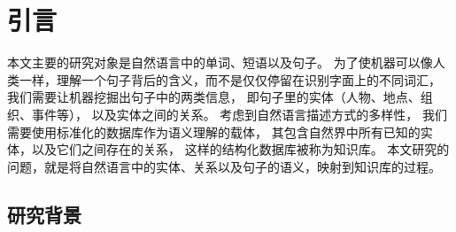 

\chapter{引言}
\label{chap:intro}


本文主要的研究对象是自然语言中的单词、短语以及句子。
为了使机器可以像人类一样，理解一个句子背后的含义，而不是仅仅停留在识别字面上的不同词汇，
我们需要让机器挖掘出句子中的两类信息，
即句子里的实体（人物、地点、组织、事件等），
以及实体之间的关系。
考虑到自然语言描述方式的多样性，
我们需要使用标准化的数据库作为语义理解的载体，
其包含自然界中所有已知的实体，以及它们之间存在的关系，
这样的结构化数据库被称为知识库。
本文研究的问题，就是将自然语言中的实体、关系以及句子的语义，映射到知识库的过程。

\section{研究背景}
\label{sec:intro-background}

